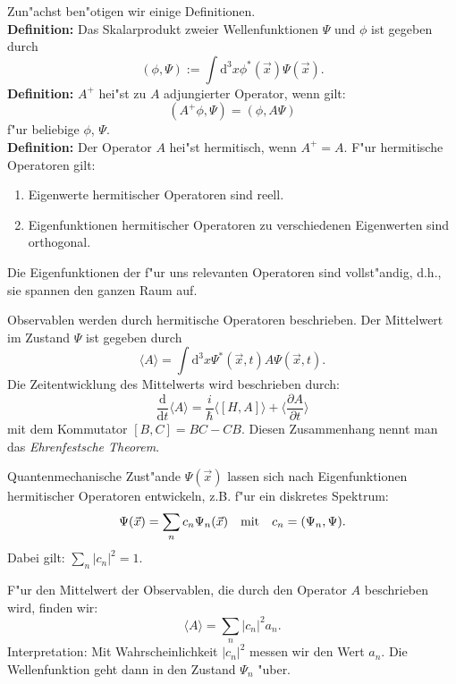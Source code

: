 Zun"achst ben"otigen wir einige Definitionen.\\
\textbf{Definition:} Das Skalarprodukt zweier Wellenfunktionen
$\Psi$ und $\phi$ ist gegeben durch
\begin{equation}
	(\phi,\Psi) := \int \mathrm{d}^3 x \phi^*(\vec x)\Psi(\vec x). 
\end{equation}
\textbf{Definition:} $A^{+}$ hei"st zu $A$ adjungierter Operator,
wenn gilt:
\begin{equation}
	(A^+ \phi, \Psi) = (\phi, A \Psi)
\end{equation}
f"ur beliebige $\phi$, $\Psi$.\\
\textbf{Definition:} Der Operator $A$ hei"st hermitisch, wenn $A^+ = A$.
F"ur hermitische Operatoren gilt:
\begin{enumerate}
	\item Eigenwerte hermitischer Operatoren sind reell.
	\item Eigenfunktionen hermitischer Operatoren zu verschiedenen
		Eigenwerten sind orthogonal.
\end{enumerate}
Die Eigenfunktionen der f"ur uns relevanten Operatoren sind vollst"andig,
d.h., sie spannen den ganzen Raum auf.

Observablen werden durch hermitische Operatoren beschrieben. Der Mittelwert
im Zustand $\Psi$ ist gegeben durch
\begin{equation}
	\langle A \rangle = \int \mathrm{d}^3 x \Psi^*(\vec x,t) A \Psi(\vec x,t).
\end{equation}
Die Zeitentwicklung des Mittelwerts wird beschrieben durch:
\begin{equation}
	\frac{\mathrm{d}}{\mathrm{d}t} \langle A \rangle =
	\frac{i}{\hbar} \langle[H,A]\rangle + \langle \frac{\partial A}
	{\partial t}\rangle
\end{equation}
mit dem Kommutator $[B,C] = BC-CB$. Diesen Zusammenhang nennt man
das \emph{Ehrenfestsche Theorem}.

Quantenmechanische Zust"ande $\Psi(\vec x)$ lassen sich nach Eigenfunktionen
hermitischer Operatoren entwickeln, z.B. f"ur ein diskretes Spektrum:
\begin{equation}
	\Psi(\vec x)=\sum \limits_{n} c_n \Psi_n(\vec x) \quad \textnormal{mit}
	\quad c_n = (\Psi_n,\Psi).
\end{equation}
Dabei gilt: $\sum \limits_n |c_n|^2 = 1$. 

F"ur den Mittelwert der Observablen, die durch den Operator $A$ 
beschrieben wird, finden wir:
\begin{equation}
	\langle A \rangle = \sum \limits_{n} |c_n|^2 a_n.
\end{equation}
Interpretation: Mit Wahrscheinlichkeit $|c_n|^2$ messen wir den Wert
$a_n$. Die Wellenfunktion geht dann in den Zustand $\Psi_n$ "uber.

